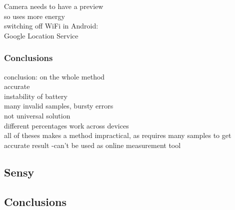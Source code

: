 	Camera needs to have a preview\\
		so uses more energy\\
   
   switching off WiFi in Android:\\
   		Google Location Service\\
   
\subsubsection{Conclusions}   
conclusion: on the whole method\\
	accurate\\
	instability of battery\\
		many invalid samples, bursty errors\\
	not universal solution\\
		different percentages work across devices\\
	all of theses makes a method impractical, as requires many samples to get accurate result
		-can't be used as online measurement tool\\

\subsection{Sensy}
\subsection{Conclusions}